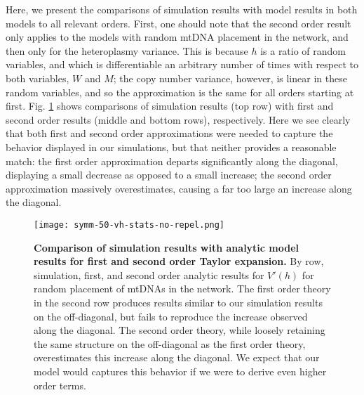 \documentclass{article}
\begin{document}
\begin{appendices}
{%
Here, we present the comparisons of simulation results with model results in both models to all relevant orders. First, one should note that the second order result only applies to the models with random mtDNA placement in the network, and then only for the heteroplasmy variance. This is because $h$ is a ratio of random variables, and which is differentiable an arbitrary number of times with respect to both variables, $W$ and $M$; the copy number variance, however, is linear in these random variables, and so the approximation is the same for all orders starting at first. Fig. \ref{fig:app-vh-stats} shows comparisons of simulation results (top row) with first and second order results (middle and bottom rows), respectively. Here we see clearly that both first and second order approximations were needed to capture the behavior displayed in our simulations, but that neither provides a reasonable match: the first order approximation departs significantly along the diagonal, displaying a small decrease as opposed to a small increase; the second order approximation massively overestimates, causing a far too large an increase along the diagonal.

\begin{figure}[!ht]
        \centering \texttt{[image: symm-50-vh-stats-no-repel.png]}
        \caption{\textbf{Comparison of simulation results with analytic model results for first and second order Taylor expansion.} By row,  simulation, first, and second order analytic results for $V'(h)$ for random placement of mtDNAs in the network. The first order theory in the second row produces results similar to our simulation results on the off-diagonal, but fails to reproduce the increase observed along the diagonal. The second order theory, while loosely retaining the same structure on the off-diagonal as the first order theory, overestimates this increase along the diagonal. We expect that our model would captures this behavior if we were to derive even higher order terms.}\label{fig:app-vh-stats}
\end{figure}

}
\end{appendices}
\end{document}
